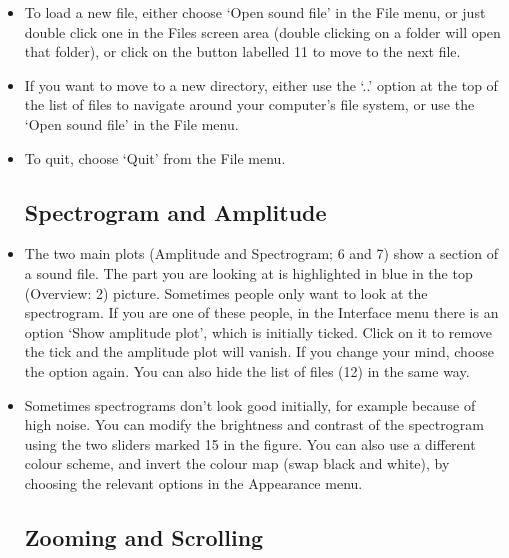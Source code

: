 \documentclass{article}
\begin{document}
\begin{itemize}
\item To load a new file, either choose `Open sound file' in the File menu, or just double click one in the Files screen area (double clicking on a folder will open that folder), or click on the button labelled 11 to move to the next file. 

\item If you want to move to a new directory, either use the `..' option at the top of the list of files to navigate around your computer's file system, or use the  `Open sound file' in the File menu.

\item To quit, choose `Quit' from the File menu. 


\subsection{Spectrogram and Amplitude}

\item The two main plots (Amplitude and Spectrogram; 6 and 7) show a section of a sound file. The part you are looking at is highlighted in blue in the top (Overview: 2) picture. Sometimes people only want to look at the spectrogram. If you are one of these people, in the Interface menu there is an option `Show amplitude plot', which is initially ticked. Click on it to remove the tick and the amplitude plot will vanish. If you change your mind, choose the option again. You can also hide the list of files (12) in the same way. 

\item Sometimes spectrograms don't look good initially, for example because of high noise. You can modify the brightness and contrast of the spectrogram using the two sliders marked 15 in the figure. You can also use a different colour scheme, and invert the colour map (swap black and white), by choosing the relevant options in the Appearance menu. 

\subsection{Zooming and Scrolling}


\end{itemize}
\end{document}

